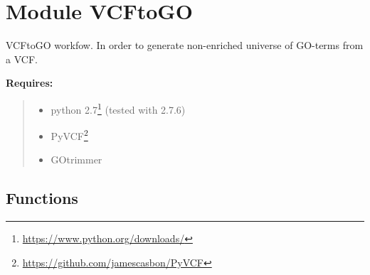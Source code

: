 %
%
%


\section{Module VCFtoGO}

    \label{VCFtoGO}
VCFtoGO workfow. In order to generate non-enriched universe of GO-terms 
from a VCF.

\textbf{Requires:}
\begin{quote}
  \begin{itemize}

  \item
    \setlength{\parskip}{0.6ex}
python 
2.7\footnote{\href{https://www.python.org/downloads/}{https://www.python.org/downloads/}}
(tested with 2.7.6)



  \item PyVCF\footnote{\href{https://github.com/jamescasbon/PyVCF}{https://github.com/jamescasbon/PyVCF}}



  \item GOtrimmer



\end{itemize}

\end{quote}



  \subsection{Functions}

    \label{VCFtoGO:get_parser}

    \vspace{0.5ex}

